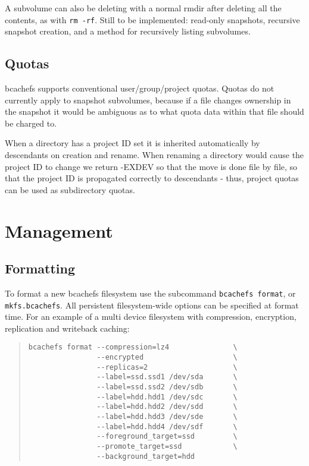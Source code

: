 \documentclass{article}
\begin{document}
A subvolume can also be deleting with a normal rmdir after deleting all the
contents, as with \texttt{rm -rf}. Still to be implemented: read-only snapshots,
recursive snapshot creation, and a method for recursively listing subvolumes.

\subsection{Quotas}

bcachefs supports conventional user/group/project quotas. Quotas do not
currently apply to snapshot subvolumes, because if a file changes ownership in
the snapshot it would be ambiguous as to what quota data within that file
should be charged to.

When a directory has a project ID set it is inherited automatically by
descendants on creation and rename. When renaming a directory would cause the
project ID to change we return -EXDEV so that the move is done file by file, so
that the project ID is propagated correctly to descendants - thus, project
quotas can be used as subdirectory quotas.

\section{Management}

\subsection{Formatting}

To format a new bcachefs filesystem use the subcommand \texttt{bcachefs
format}, or \texttt{mkfs.bcachefs}. All persistent filesystem-wide options can
be specified at format time. For an example of a multi device filesystem with
compression, encryption, replication and writeback caching:
\begin{quote} \begin{verbatim}
bcachefs format --compression=lz4               \
                --encrypted                     \
                --replicas=2                    \
                --label=ssd.ssd1 /dev/sda       \
                --label=ssd.ssd2 /dev/sdb       \
                --label=hdd.hdd1 /dev/sdc       \
                --label=hdd.hdd2 /dev/sdd       \
                --label=hdd.hdd3 /dev/sde       \
                --label=hdd.hdd4 /dev/sdf       \
                --foreground_target=ssd	        \
                --promote_target=ssd            \
                --background_target=hdd
\end{verbatim} \end{quote}
\end{document}
